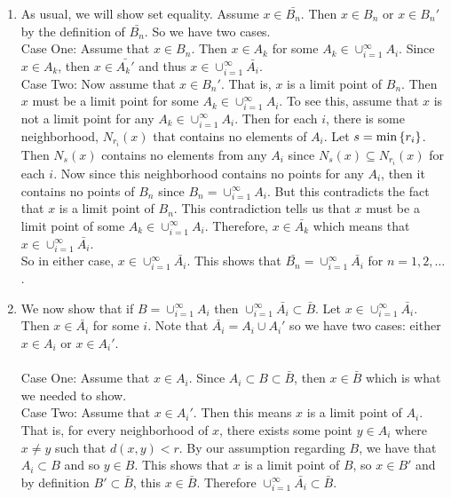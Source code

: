 \documentclass[12pt]{article}
\begin{document}
\begin{enumerate}

\item As usual, we will show set equality. Assume $x \in \bar{B_{n}}$. Then $x \in B_{n}$ or $x \in B_{n}'$ by the definition of $ \bar{B_{n}}$. So we have two cases. \\ 

Case One: Assume that $x \in B_{n}$. Then $x \in A_{k}$ for some $A_{k} \in \cup_{i=1}^{\infty} A_{i}$. Since $x \in A_{k}$, then $x \in \bar{A_{k}'}$ and thus $x \in  \cup^{\infty}_{i=1} \bar{A_{i}}$. \\ 

Case Two: Now assume that  $x \in B_{n}'$. That is, $x$ is a limit point of $B_{n}$. Then $x$ must be a limit point for some $A_{k} \in \cup_{i=1}^{\infty} A_{i}$. To see this, assume that $x$ is not a limit point for any $A_{k} \in \cup_{i=1}^{\infty} A_{i}$. Then for each $i$, there is some neighborhood, $N_{r_{i}}(x)$ that contains no elements of $A_{i}$. Let $s= \text{min} \left\{r_{i}\right\}$. Then $N_{s}(x)$ contains no elements from any $A_{i}$ since $N_{s}(x) \subseteq N_{r_{i}}(x)$ for each $i$. Now since this neighborhood contains no points for any $A_{i}$, then it contains no points of $B_{n}$ since $B_{n}= \cup_{i=1}^{\infty} A_{i}$. But this contradicts the fact that $x$ is a limit point of $B_{n}$. This contradiction tells us that $x$ must be a limit point of some $A_{k} \in \cup_{i=1}^{\infty} A_{i}$. Therefore, $x \in \bar{A_{k}}$ which means that $x \in \cup^{\infty}_{i=1} \bar{A_{i}}$. \\ 

So in either case, $x \in \cup^{\infty}_{i=1} \bar{A_{i}}$. This shows that $\bar{B_{n}}=\cup^{\infty}_{i=1} \bar{A_{i}}$ for $n=1,2, \ldots$. \\ 

\item We now show that if $B = \cup^{\infty }_{i=1}A_{i}$ then $\cup^{\infty }_{i=1} \bar{A_{i}} \subset \bar{B}$. Let $x \in \cup^{\infty }_{i=1} \bar{A_{i}}$. Then $x \in  \bar{A_{i}}$ for some $i$. Note that $\bar{A_{i}} = A_{i} \cup A_{i}'$ so we have two cases: either $x \in A_{i}$ or $x \in A_{i}'$. \\ \\
Case One: Assume that $x \in A_{i}$. Since $A_{i} \subset B \subset \bar{B}$, then $x \in \bar{B}$ which is what we needed to show. \\ 

Case Two: Assume that $x \in A_{i}'$. Then this means $x$ is a limit point of $A_{i}$. That is, for every neighborhood of $x$, there exists some point $y \in A_{i}$ where $x \neq y$ such that $d(x,y)<r$. By our assumption regarding $B$, we have that $A_{i} \subset B$ and so $y \in B$. This shows that $x$ is a limit point of $B$, so $x \in B'$ and by definition $B' \subset \bar{B}$, this $x \in \bar{B}$. Therefore $\cup^{\infty }_{i=1} \bar{A_{i}} \subset \bar{B}$. \\ \\


\end{enumerate}
\end{document}
